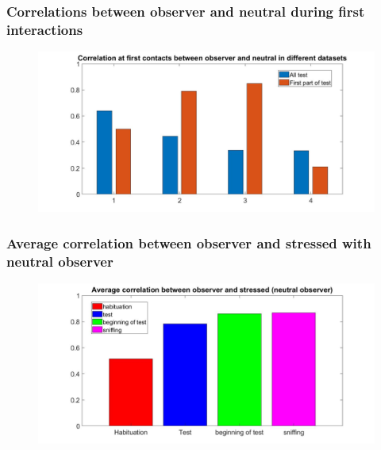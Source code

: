 \documentclass{beamer}
\begin{document}
\begin{frame}
\frametitle{ Correlations between observer and neutral during first interactions}



\begin{figure}[H]
	\begin{center}
		\hspace*{-1.7cm}
		\includegraphics[scale=.32]{corr_bar_contact_neut.jpg} 
	\end{center}  
	
	
\end{figure}

\end{frame}

\begin{frame}
\frametitle{ Average correlation between observer and stressed with neutral observer}



\begin{figure}[H]
	\begin{center}
		\hspace*{-1.7cm}
		\includegraphics[scale=.32]{avg_corr_stress.jpg} 
	\end{center}  
	
	
\end{figure}

\end{frame}
\end{document}
